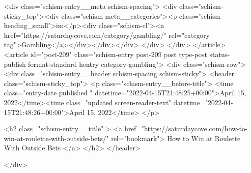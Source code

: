 {		<div class="schism-entry__meta schism-spacing">			<div class="schism-sticky_top"><div class="schism-meta__categories"><p class="schism-heading_small">in:</p><div class="schism-cl"><a href="https://saturdaycove.com/category/gambling/" rel="category tag">Gambling</a></div></div></div>		</div>
	</div>
</article>
<article id="post-209" class="schism-entry post-209 post type-post status-publish format-standard hentry category-gambling">
	<div class="schism-row">		<div class="schism-entry__header schism-spacing schism-sticky">			<header class="schism-sticky_top">				<p class="schism-entry__before-title">
					<time class="entry-date published " datetime="2022-04-15T21:48:25+00:00">April 15, 2022</time><time class="updated screen-reader-text" datetime="2022-04-15T21:48:26+00:00">April 15, 2022</time>				</p>

				<h2 class="schism-entry__title" >
					<a href="https://saturdaycove.com/how-to-win-at-roulette-with-outside-bets/" rel="bookmark">
						How to Win at Roulette With Outside Bets					</a>
				</h2>
			</header>

					</div>

}
